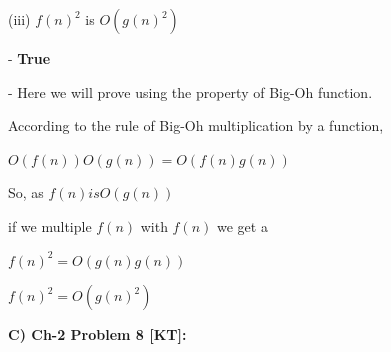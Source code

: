 \documentclass[letterpaper,portrait,12pt]{article}
\begin{document}
\begin{flushleft}

\end{flushleft}


\begin{flushleft}
(iii) ${f(n)}^2$ is $O({g(n)}^2)$
\end{flushleft}


\begin{flushleft}
- \textbf{True}
\end{flushleft}


\begin{flushleft}
- Here we will prove using the property of Big-Oh function.
\end{flushleft}


\begin{flushleft}
According to the rule of Big-Oh multiplication by a function,
\end{flushleft}


\begin{flushleft}
$O(f(n)) O(g(n)) = O(f(n)g(n))$
\end{flushleft}


\begin{flushleft}

\end{flushleft}


\begin{flushleft}
So, as $f(n) is O(g(n))
$
\end{flushleft}


\begin{flushleft}
if we multiple $f(n) 
$ with $f(n) 
$ we get a 
\end{flushleft}


\begin{flushleft}
$f(n) ^2 = O(g(n)g(n))
$
\end{flushleft}


\begin{flushleft}
$f(n) ^2 = O(g(n)^2)
$
\end{flushleft}


\begin{flushleft}

\end{flushleft}


\begin{flushleft}
\textbf{C) Ch-2 Problem 8 [KT]:}
\end{flushleft}


\begin{flushleft}

\end{flushleft}
\end{document}
